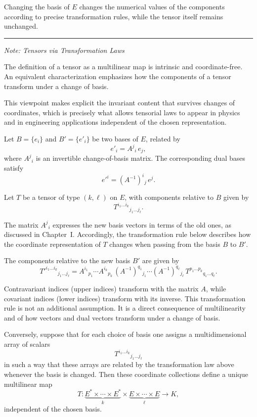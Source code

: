 \medskip

Changing the basis of $E$ changes the numerical values of the components
according to precise transformation rules, while the tensor itself remains
unchanged.

\bigskip
\hrule
\medskip

\textit{Note: Tensors via Transformation Laws}

The definition of a tensor as a multilinear map is intrinsic and
coordinate-free. An equivalent characterization emphasizes how the components
of a tensor transform under a change of basis.

\medskip

This viewpoint makes explicit the invariant content that survives changes of
coordinates, which is precisely what allows tensorial laws to appear in physics
and in engineering applications independent of the chosen representation.

\medskip

Let $B = \{e_i\}$ and $B' = \{e'_i\}$ be two bases of $E$, related by
\[
e'_i = A^j{}_i \, e_j,
\]
where $A^j{}_i$ is an invertible change-of-basis matrix.
The corresponding dual bases satisfy
\[
e'^i = (A^{-1})^i{}_j \, e^j.
\]

\medskip

Let $T$ be a tensor of type $(k,\ell)$ on $E$, with components relative to $B$
given by
\[
T^{i_1 \dots i_k}{}_{j_1 \dots j_\ell}.
\]

The matrix $A^j{}_i$ expresses the new basis vectors in terms of the old ones,
as discussed in Chapter~I.
Accordingly, the transformation rule below describes how the coordinate
representation of $T$ changes when passing from the basis $B$ to $B'$.

\medskip

The components relative to the new basis $B'$ are given by
\[
T'^{i_1 \dots i_k}{}_{j_1 \dots j_\ell}
=
A^{i_1}{}_{p_1}
\cdots
A^{i_k}{}_{p_k}
\,
(A^{-1})^{q_1}{}_{j_1}
\cdots
(A^{-1})^{q_\ell}{}_{j_\ell}
\,
T^{p_1 \dots p_k}{}_{q_1 \dots q_\ell}.
\]

\medskip

Contravariant indices (upper indices) transform with the matrix $A$, while
covariant indices (lower indices) transform with its inverse.
This transformation rule is not an additional assumption.
It is a direct consequence of multilinearity and of how vectors and dual vectors
transform under a change of basis.

\medskip

Conversely, suppose that for each choice of basis one assigns a multidimensional
array of scalars
\[
T^{i_1 \dots i_k}{}_{j_1 \dots j_\ell}
\]
in such a way that these arrays are related by the transformation law above
whenever the basis is changed.
Then these coordinate collections define a unique multilinear map
\[
T :
\underbrace{E^* \times \cdots \times E^*}_{k}
\times
\underbrace{E \times \cdots \times E}_{\ell}
\longrightarrow K,
\]
independent of the chosen basis.


